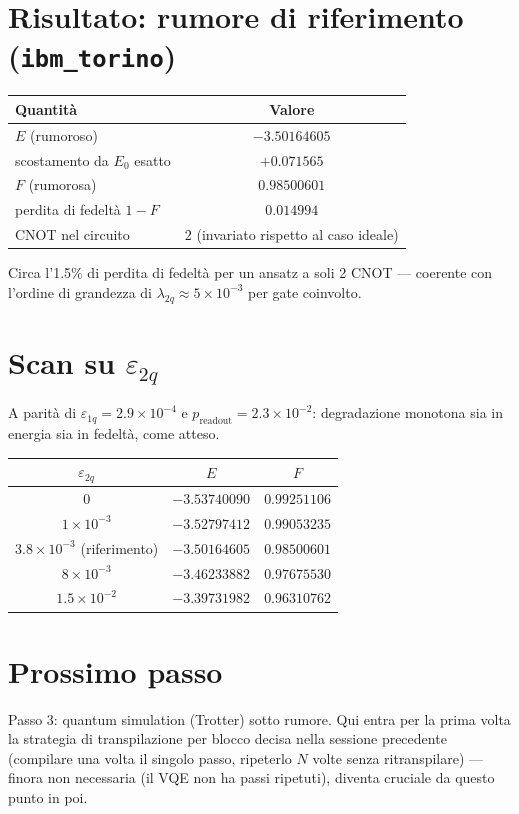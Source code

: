 \documentclass[11pt,a4paper]{article}
\begin{document}
\section*{Risultato: rumore di riferimento (\texttt{ibm\_torino})}

\begin{center}
\renewcommand{\arraystretch}{1.25}
\begin{tabular}{@{}lc@{}}
\toprule
\textbf{Quantità} & \textbf{Valore}\\
\midrule
$E$ (rumoroso) & $-3.50164605$\\
scostamento da $E_0$ esatto & $+0.071565$\\
$F$ (rumorosa) & $0.98500601$\\
perdita di fedeltà $1-F$ & $0.014994$\\
CNOT nel circuito & $2$ (invariato rispetto al caso ideale)\\
\bottomrule
\end{tabular}
\end{center}

\noindent Circa l'1.5\% di perdita di fedeltà per un ansatz a soli 2 CNOT
--- coerente con l'ordine di grandezza di $\lambda_{2q}\approx5\times10^{-3}$
per gate coinvolto.

\section*{Scan su $\varepsilon_{2q}$}

A parità di $\varepsilon_{1q}=2.9\times10^{-4}$ e
$p_\text{readout}=2.3\times10^{-2}$: degradazione monotona sia in energia
sia in fedeltà, come atteso.

\begin{center}
\renewcommand{\arraystretch}{1.2}
\begin{tabular}{@{}ccc@{}}
\toprule
$\varepsilon_{2q}$ & $E$ & $F$ \\
\midrule
$0$ & $-3.53740090$ & $0.99251106$ \\
$1\times10^{-3}$ & $-3.52797412$ & $0.99053235$ \\
$3.8\times10^{-3}$ (riferimento) & $-3.50164605$ & $0.98500601$ \\
$8\times10^{-3}$ & $-3.46233882$ & $0.97675530$ \\
$1.5\times10^{-2}$ & $-3.39731982$ & $0.96310762$ \\
\bottomrule
\end{tabular}
\end{center}

\section*{Prossimo passo}

Passo 3: quantum simulation (Trotter) sotto rumore. Qui entra per la prima
volta la strategia di transpilazione per blocco decisa nella sessione
precedente (compilare una volta il singolo passo, ripeterlo $N$ volte senza
ritranspilare) --- finora non necessaria (il VQE non ha passi ripetuti),
diventa cruciale da questo punto in poi.
\end{document}
